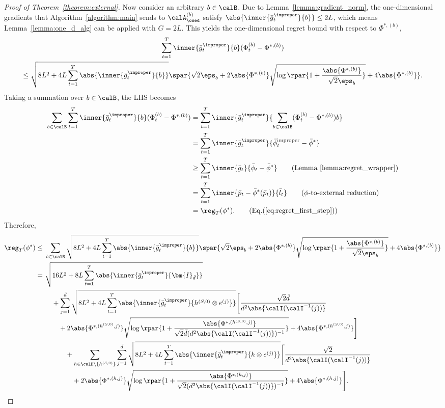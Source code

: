 \documentclass[10pt]{article}
\begin{document}
\begin{proof}[Proof of Theorem~\ref{theorem:external}]
Now consider an arbitrary $b\in\calB$. Due to Lemma~\ref{lemma:gradient_norm}, the one-dimensional gradients that Algorithm~\ref{algorithm:main} sends to $\calA_\oned^{(b)}$ satisfy $\abs{\inner{\bar g_t^\improper}{b}}\leq 2L$, which means Lemma~\ref{lemma:one_d_alg} can be applied with $G=2L$. This yields the one-dimensional regret bound with respect to $\Phi^{*,(b)}$,
\begin{multline*}
\sum_{t=1}^T\inner{\bar g_t^\improper}{b}(\Phi_t^{(b)}-\Phi^{*,(b)})\\
\leq \sqrt{8L^2+4L\sum_{t=1}^T\abs{\inner{\bar g_t^\improper}{b}}}\spar{\sqrt{2}\eps_b+2\abs{\Phi^{*,(b)}}\sqrt{\log\rpar{1+\frac{\abs{\Phi^{*,(b)}}}{\sqrt{2}\eps_b}}}+4\abs{\Phi^{*,(b)}}}.
\end{multline*}
Taking a summation over $b\in\calB$, the LHS becomes
\begin{align*}
\sum_{b\in\calB}\sum_{t=1}^T\inner{\bar g_t^\improper}{b}(\Phi_t^{(b)}-\Phi^{*,(b)})&=\sum_{t=1}^T\inner{\bar g_t^\improper}{\sum_{b\in\calB}(\Phi_t^{(b)}-\Phi^{*,(b)})b}\\
&=\sum_{t=1}^T\inner{\bar g_t^\improper}{\bar\phi_t^{\mathrm{improper}}-\bar\phi^*}\\
&\geq \sum_{t=1}^T\inner{\bar g_t}{\bar \phi_t-\bar \phi^*}\tag{Lemma~\ref{lemma:regret_wrapper}}\\
&=\sum_{t=1}^T\inner{\bar p_t-\bar\phi^*(\bar p_t)}{\bar l_t}\tag{$\phi$-to-external reduction}\\
&=\reg_T(\phi^*).\tag{Eq.(\ref{eq:regret_first_step})}
\end{align*}
Therefore, 
\begin{align}
\reg_T(\phi^*)
\leq~& \sum_{b\in\calB}\sqrt{8L^2+4L\sum_{t=1}^T\abs{\inner{\bar g_t^\improper}{b}}}\spar{\sqrt{2}\eps_b+2\abs{\Phi^{*,(b)}}\sqrt{\log\rpar{1+\frac{\abs{\Phi^{*,(b)}}}{\sqrt{2}\eps_b}}}+4\abs{\Phi^{*,(b)}}}\nonumber\\
=~&\sqrt{16L^2+8L\sum_{t=1}^T\abs{\inner{\bar g_t^\improper}{\bm{I}_{\bar d}}}}\nonumber\\
&\quad+\sum_{j=1}^{\bar d}\sqrt{8L^2+4L\sum_{t=1}^T\abs{\inner{\bar g_t^\improper}{h^{(S,0)}\otimes e^{(j)}}}}\Bigg[\frac{\sqrt{2}\bar d}{d^2\abs{\calI(\calI^{-1}(j))}}\nonumber\\
&\quad\quad +2\abs{\Phi^{*,(h^{(S,0)},j)}}\sqrt{\log\rpar{1+\frac{\abs{\Phi^{*,(h^{(S,0)},j)}}}{\sqrt{2}\bar d(d^2\abs{\calI(\calI^{-1}(j))})^{-1}}}}+4\abs{\Phi^{*,(h^{(S,0)},j)}}\Bigg]\nonumber\\
&\quad\quad\quad+\sum_{h\in\calH\backslash\{h^{(S,0)}\}}\sum_{j=1}^{\bar d}\sqrt{8L^2+4L\sum_{t=1}^T\abs{\inner{\bar g_t^\improper}{h\otimes e^{(j)}}}}\Bigg[\frac{\sqrt{2}}{d^2\abs{\calI(\calI^{-1}(j))}}\nonumber\\
&\quad\quad\quad\quad +2\abs{\Phi^{*,(h,j)}}\sqrt{\log\rpar{1+\frac{\abs{\Phi^{*,(h,j)}}}{\sqrt{2}(d^2\abs{\calI(\calI^{-1}(j))})^{-1}}}}+4\abs{\Phi^{*,(h,j)}}\Bigg].\label{eq:big_regret}
\end{align}


\end{proof}
\end{document}
